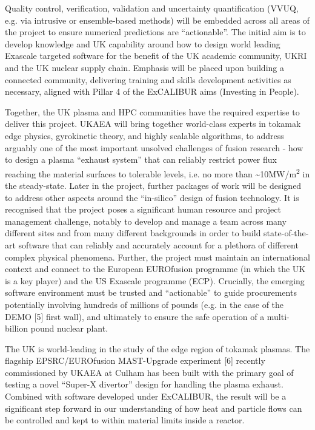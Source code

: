 \documentclass{article}
\begin{document}
\vspace{24pt}
{\color{color29} Quality control, verification, validation and uncertainty quantification 
(VVUQ, e.g. via intrusive or ensemble-based methods) will be embedded across all 
areas of the project to ensure numerical predictions are ``actionable''. The initial 
aim is to develop knowledge and UK capability around how to design world leading 
Exascale targeted software for the benefit of the UK academic community, UKRI and 
the UK nuclear supply chain. Emphasis will be placed upon building a connected 
community, delivering training and skills development activities as necessary, 
aligned with Pillar 4 of the ExCALIBUR aims (Investing in People).}

\vspace{24pt}
Together, the UK plasma and HPC communities have the required expertise to deliver 
this project. UKAEA will bring together world-class experts in tokamak edge physics, 
gyrokinetic theory, and highly scalable algorithms, to address arguably one of 
the most important unsolved challenges of fusion research - how to design a plasma 
``exhaust system'' that can reliably restrict power flux reaching the material 
surfaces to tolerable levels, i.e. no more than \textasciitilde{}10MW/m\textsuperscript{2} 
in the steady-state. Later in the project, further packages of work will be designed 
to address other aspects around the ``in-silico'' design of fusion technology. 
It is recognised that the project poses a significant human resource and project 
management challenge, notably to develop and manage a team across many different 
sites and from many different backgrounds in order to build state-of-the-art software 
that can reliably and accurately account for a plethora of different complex physical 
phenomena. Further, the project must maintain an international context and connect 
to the European EUROfusion programme (in which the UK is a key player) and the 
US Exascale programme (ECP). Crucially, the emerging software environment must 
be trusted and ``actionable'' to guide procurements potentially involving hundreds 
of millions of pounds (e.g. in the case of the {\color{color29} DEMO [5] first 
wall}), and ultimately to ensure the safe operation of a multi-billion pound nuclear 
plant.

\vspace{24pt}
The UK is world-leading in the study of the edge region of tokamak plasmas. The 
flagship EPSRC/EUROfusion MAST-Upgrade {\color{color29} experiment [6] recently 
}commissioned by UKAEA at Culham has been built with the primary goal of testing 
a novel ``Super-X divertor'' design for handling the plasma exhaust. Combined with 
software developed under ExCALIBUR, the result will be a significant step forward 
in our understanding of how heat and particle flows can be controlled and kept 
to within material limits inside a reactor.
\end{document}
